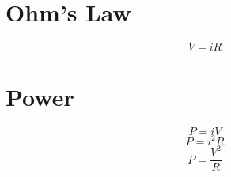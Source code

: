 \documentclass{article}
\begin{document}
    \section{Ohm's Law}

        \begin{equation}
            V = i R
        \end{equation}

    \section{Power}

        \begin{equation}
            P = i V
        \end{equation}
        \begin{equation}
            P = i^2 R
        \end{equation}
        \begin{equation}
            P = \frac{V^2}{R}
        \end{equation}
\end{document}
